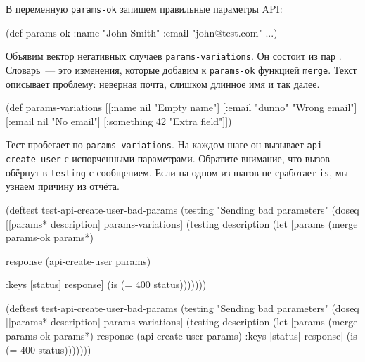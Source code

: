 В переменную \verb|params-ok| запишем правильные параметры API:

\begin{english}
  \begin{clojure}
(def params-ok {:name "John Smith"
                :email "john@test.com"
                ...})
  \end{clojure}
\end{english}

Объявим вектор негативных случаев \verb|params-variations|. Он состоит из пар
. Словарь~--- это изменения, которые добавим к
\verb|params-ok| функцией \verb|merge|. Текст описывает проблему: неверная
почта, слишком длинное имя и так далее.

\begin{english}
  \begin{clojure}
(def params-variations
  [[{:name nil}      "Empty name"]
   [{:email "dunno"} "Wrong email"]
   [{:email nil}     "No email"]
   [{:something 42}  "Extra field"]])
  \end{clojure}
\end{english}

Тест пробегает по \verb|params-variations|. На каждом шаге он вызывает
\verb|api-create-user| с испорченными параметрами. Обратите внимание, что вызов
обёрнут в \verb|testing| с сообщением. Если на одном из шагов не сработает
\verb|is|, мы узнаем причину из отчёта.

\ifx\DEVICETYPE\MOBILE

\begin{english}
  \begin{clojure}
(deftest test-api-create-user-bad-params
  (testing "Sending bad parameters"
    (doseq [[params* description]
            params-variations]
      (testing description
        (let [params
              (merge params-ok params*)

              response
              (api-create-user params)

              {:keys [status]} response]
          (is (= 400 status)))))))
  \end{clojure}
\end{english}

\else

\begin{english}
  \begin{clojure}
(deftest test-api-create-user-bad-params
  (testing "Sending bad parameters"
    (doseq [[params* description] params-variations]
      (testing description
        (let [params (merge params-ok params*)
              response (api-create-user params)
              {:keys [status]} response]
          (is (= 400 status)))))))
  \end{clojure}
\end{english}

